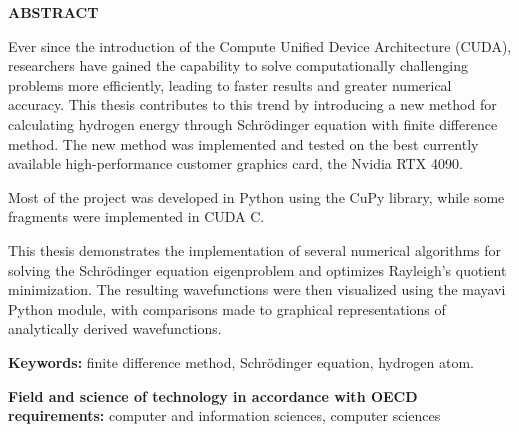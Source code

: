 \noindent
\begingroup
\fontsize{12pt}{1.5pt}\selectfont
\textbf{ABSTRACT}
\endgroup

\vspace{3mm}

Ever since the introduction of the Compute Unified Device Architecture (CUDA), researchers have gained the capability to solve computationally challenging problems more efficiently, leading to faster results and greater numerical accuracy. This thesis contributes to this trend by introducing a new method for calculating hydrogen energy through Schr{\"o}dinger equation with finite difference method. The new method was implemented and tested on the best currently available high-performance customer graphics card, the Nvidia RTX 4090.

Most of the project was developed in Python using the CuPy library, while some fragments were implemented in CUDA C.

This thesis demonstrates the implementation of several numerical algorithms for solving the Schrödinger equation eigenproblem and optimizes Rayleigh's quotient minimization. The resulting wavefunctions were then visualized using the mayavi Python module, with comparisons made to graphical representations of analytically derived wavefunctions.

\textbf{Keywords:} finite difference method, Schrödinger equation, hydrogen atom.

\textbf{Field and science of technology in accordance with OECD requirements:}
computer and information sciences, computer sciences
